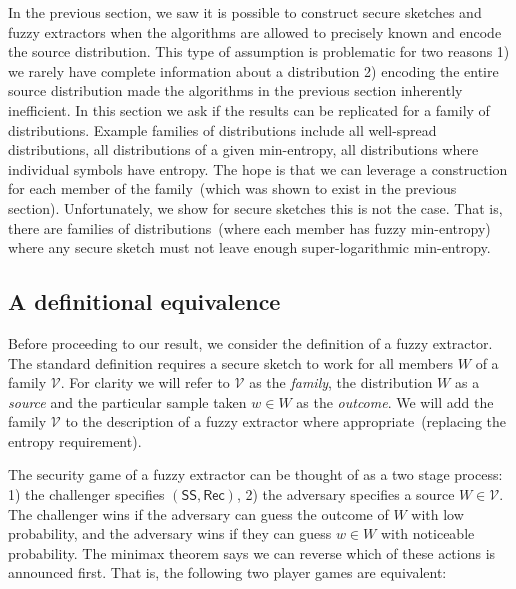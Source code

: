 \documentclass[11pt]{article}
\newcommand{\class}[1]{{\ensuremath{\mathsf{#1}}}}
\newcommand{\sketch}{\ensuremath{\class{SS}}\xspace}
\newcommand{\rec}{\ensuremath{\class{Rec}}\xspace}
\begin{document}
In the previous section, we saw it is possible to construct secure sketches and fuzzy extractors when the algorithms are allowed to precisely known and encode the source distribution.  This type of assumption is problematic for two reasons 1) we rarely have complete information about a distribution 2) encoding the entire source distribution made the algorithms in the previous section inherently inefficient.  In this section we ask if the results can be replicated for a family of distributions.  Example families of distributions include all well-spread distributions, all distributions of a given min-entropy, all distributions where individual symbols have entropy.  The hope is that we can leverage a construction for each member of the family~(which was shown to exist in the previous section).  Unfortunately, we show for secure sketches this is not the case.  That is, there are families of distributions~(where each member has fuzzy min-entropy) where any secure sketch must not leave enough super-logarithmic min-entropy.

\subsection{A definitional equivalence}
Before proceeding to our result, we consider the definition of a fuzzy extractor.  The standard definition requires a secure sketch to work for all members $W$ of a family $\mathcal{V}$.  For clarity we will refer to $\mathcal{V}$ as the \emph{family}, the distribution $W$ as a \emph{source} and the particular sample taken $w\in W$ as the \emph{outcome}.    We will add the family $\mathcal{V}$ to the description of a fuzzy extractor where appropriate~(replacing the entropy requirement).

The security game of a fuzzy extractor can be thought of as a two stage process: 1) the challenger specifies $(\sketch, \rec)$, 2) the adversary specifies a source $W\in \mathcal{V}$.  The challenger wins if the adversary can guess the outcome of $W$ with low probability, and the adversary wins if they can guess $w\in W$ with noticeable probability.  The minimax theorem says we can reverse which of these actions is announced first.  That is, the following two player games are equivalent:

\end{document}
